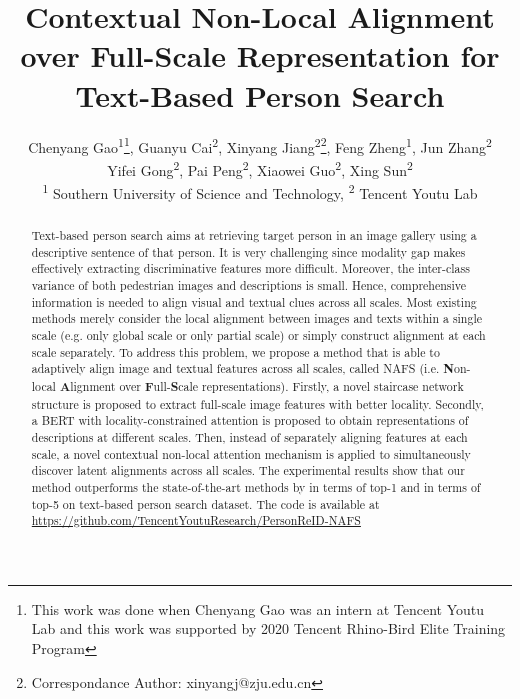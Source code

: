 \documentclass[final]{cvpr}
\begin{document}
\title{Contextual Non-Local Alignment over Full-Scale Representation for Text-Based Person Search}

\author
{Chenyang Gao\textsuperscript{\rm 1}\thanks{This work was done when Chenyang Gao was an intern at Tencent Youtu Lab and this work was supported by 2020 Tencent Rhino-Bird Elite Training Program}, 
Guanyu Cai\textsuperscript{\rm 2},
Xinyang Jiang\textsuperscript{\rm 2}\thanks{Correspondance Author: xinyangj@zju.edu.cn},
Feng Zheng\textsuperscript{\rm 1},
Jun Zhang\textsuperscript{\rm 2}\\
Yifei Gong\textsuperscript{\rm 2}, 
Pai Peng\textsuperscript{\rm 2},
Xiaowei Guo\textsuperscript{\rm 2},
Xing Sun\textsuperscript{\rm 2}\\
\textsuperscript{\rm 1} Southern University of Science and Technology, 
\textsuperscript{\rm 2} Tencent Youtu Lab\\
}


\maketitle

\begin{abstract}
Text-based person search aims at retrieving target person in an image gallery using a descriptive sentence of that person. 
It is very challenging since modality gap makes effectively extracting discriminative features more difficult. Moreover, the inter-class variance of both pedestrian images and descriptions is small. Hence, comprehensive information is needed to align visual and textual clues across all scales. 
Most existing methods merely consider the local alignment between images and texts within a single scale (e.g. only global scale or only partial scale) or simply construct alignment at each scale separately. 
To address this problem, we propose a method that is able to adaptively align image and textual features across all scales, called NAFS (i.e. \textbf{N}on-local \textbf{A}lignment over \textbf{F}ull-\textbf{S}cale representations). 
Firstly, a novel staircase network structure is proposed to extract full-scale image features with better locality. 
Secondly, a BERT with locality-constrained attention is proposed to obtain representations of descriptions at different scales. 
Then, instead of separately aligning features at each scale, a novel contextual non-local attention mechanism is applied to simultaneously discover latent alignments across all scales. The experimental results show that our method outperforms the state-of-the-art methods by  in terms of top-1 and  in terms of top-5 on text-based person search dataset. \textup{The code is available at \url{https://github.com/TencentYoutuResearch/PersonReID-NAFS}}

\end{abstract}
\end{document}
